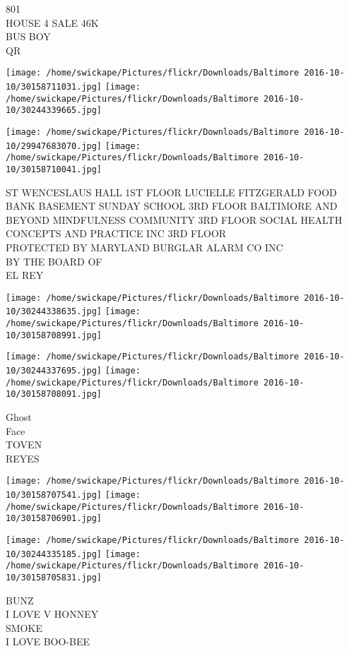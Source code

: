 \documentclass[10pt,letterpaper]{article}
\begin{document}
801\\
HOUSE 4 SALE 46K\\
BUS BOY\\
QR
\pagebreak

\texttt{[image: /home/swickape/Pictures/flickr/Downloads/Baltimore 2016-10-10/30158711031.jpg]}
\texttt{[image: /home/swickape/Pictures/flickr/Downloads/Baltimore 2016-10-10/30244339665.jpg]}

\texttt{[image: /home/swickape/Pictures/flickr/Downloads/Baltimore 2016-10-10/29947683070.jpg]}
\texttt{[image: /home/swickape/Pictures/flickr/Downloads/Baltimore 2016-10-10/30158710041.jpg]}

ST WENCESLAUS HALL 1ST FLOOR LUCIELLE FITZGERALD FOOD BANK BASEMENT SUNDAY SCHOOL 3RD FLOOR BALTIMORE AND BEYOND MINDFULNESS COMMUNITY 3RD FLOOR SOCIAL HEALTH CONCEPTS AND PRACTICE INC 3RD FLOOR\\
PROTECTED BY MARYLAND BURGLAR ALARM CO INC\\
BY THE BOARD OF\\
EL REY
\pagebreak

\texttt{[image: /home/swickape/Pictures/flickr/Downloads/Baltimore 2016-10-10/30244338635.jpg]}
\texttt{[image: /home/swickape/Pictures/flickr/Downloads/Baltimore 2016-10-10/30158708991.jpg]}

\texttt{[image: /home/swickape/Pictures/flickr/Downloads/Baltimore 2016-10-10/30244337695.jpg]}
\texttt{[image: /home/swickape/Pictures/flickr/Downloads/Baltimore 2016-10-10/30158708091.jpg]}

Ghost\\
Face\\
TOVEN\\
REYES
\pagebreak

\texttt{[image: /home/swickape/Pictures/flickr/Downloads/Baltimore 2016-10-10/30158707541.jpg]}
\texttt{[image: /home/swickape/Pictures/flickr/Downloads/Baltimore 2016-10-10/30158706901.jpg]}

\texttt{[image: /home/swickape/Pictures/flickr/Downloads/Baltimore 2016-10-10/30244335185.jpg]}
\texttt{[image: /home/swickape/Pictures/flickr/Downloads/Baltimore 2016-10-10/30158705831.jpg]}

BUNZ\\
I LOVE V HONNEY\\
SMOKE\\
I LOVE BOO{-}BEE
\pagebreak
\end{document}
